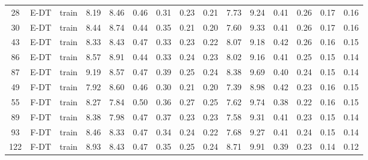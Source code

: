 \begin{table}
\begin{tabular}{@{\hskip3pt}c@{\hskip3pt}c@{\hskip3pt}c@{\hskip3pt}c@{\hskip3pt}c@{\hskip3pt}c@{\hskip3pt}c@{\hskip3pt}c@{\hskip3pt}c@{\hskip3pt}c@{\hskip3pt}c@{\hskip3pt}c@{\hskip3pt}c@{\hskip3pt}c@{\hskip3pt}c}
         28 &           E-DT &                     train &              8.19 &        8.46 &          0.46 &        0.31 &        0.23 &         0.21 &                7.73 &        9.24 &          0.41 &        0.26 &        0.17 &         0.16 \\
         30 &           E-DT &                     train &              8.44 &        8.74 &          0.44 &        0.35 &        0.21 &         0.20 &                7.60 &        9.33 &          0.41 &        0.26 &        0.17 &         0.16 \\
         43 &           E-DT &                     train &              8.33 &        8.43 &          0.47 &        0.33 &        0.23 &         0.22 &                8.07 &        9.18 &          0.42 &        0.26 &        0.16 &         0.15 \\
         86 &           E-DT &                     train &              8.57 &        8.91 &          0.44 &        0.33 &        0.24 &         0.23 &                8.02 &        9.16 &          0.41 &        0.25 &        0.15 &         0.14 \\
         87 &           E-DT &                     train &              9.19 &        8.57 &          0.47 &        0.39 &        0.25 &         0.24 &                8.38 &        9.69 &          0.40 &        0.24 &        0.15 &         0.14 \\
         49 &           F-DT &                     train &              7.92 &        8.60 &          0.46 &        0.30 &        0.21 &         0.20 &                7.39 &        8.98 &          0.42 &        0.23 &        0.16 &         0.15 \\
         55 &           F-DT &                     train &              8.27 &        7.84 &          0.50 &        0.36 &        0.27 &         0.25 &                7.62 &        9.74 &          0.38 &        0.22 &        0.16 &         0.15 \\
         89 &           F-DT &                     train &              8.38 &        7.98 &          0.47 &        0.37 &        0.23 &         0.23 &                7.58 &        9.31 &          0.41 &        0.23 &        0.15 &         0.14 \\
         93 &           F-DT &                     train &              8.46 &        8.33 &          0.47 &        0.34 &        0.24 &         0.22 &                7.68 &        9.27 &          0.41 &        0.24 &        0.15 &         0.14 \\
        122 &           F-DT &                     train &              8.93 &        8.43 &          0.47 &        0.35 &        0.25 &         0.24 &                8.71 &        9.91 &          0.39 &        0.23 &        0.14 &         0.12 \\
\bottomrule
\end{tabular}
\end{table}

